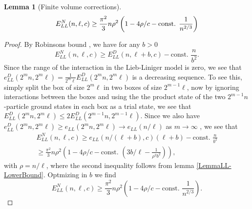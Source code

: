 \documentclass[a4paper,11pt]{article}
\newtheorem{lemma}{Lemma}
\numberwithin{equation}{section}
\begin{document}
	\begin{lemma}[Finite volume corrections]\label{LemmaLiebLinigerNeumannLowerBound}
		\begin{equation}
		E_{LL}^{N}(n,\ell,c)\geq \frac{\pi^2}{3}n\rho^2\left(1-4\rho/c-\textnormal{const. }\frac{1}{n^{2/3}}\right)
		\end{equation}
	\end{lemma}
	\begin{proof}
		By Robinsons bound \cite{robinson2014thermodynamic}, we have for any $ b>0 $ \begin{equation}
		E_{LL}^{N}(n,\ell,c)\geq E_{LL}^D(n,\ell+b,c)-\text{const. }\frac{n}{b^2}.
		\end{equation}
		Since the range of the interaction in the Lieb-Liniger model is zero, we see that $ e^D_{LL}(2^mn,2^m\ell)=\frac{1}{2^m\ell}E_{LL}^{D}(2^mn,2^m\ell) $ is a decreasing sequence. To see this, simply split the box of size $ 2^m\ell $ in two boxes of size $ 2^{m-1}\ell $, now by ignoring interactions between the boxes and using the the product state of the two $ 2^{m-1}n $-particle ground states in each box as a trial state, we see that $ E^D_{LL}(2^{m}n,2^m\ell)\leq 2E^D_{LL}(2^{m-1}n,2^{m-1}\ell)  $. Since we also have $ e^D_{LL}(2^mn,2^m\ell)\geq e_{LL}(2^mn,2^m\ell)\to e_{LL}(n/\ell) $ as $ m\to\infty $ \cite{PhysRev.130.1605}, we see that \begin{equation}
		\begin{aligned}
		E_{LL}^{N}(n,\ell,c)\geq e_{LL}(n/(\ell+b),c)(\ell+b)-\text{const. }\frac{n}{b^2}\\\geq \frac{\pi^2}{3}n\rho^2\left(1-4\rho/c-\text{const. }\left(3b/\ell-\frac{1}{\rho^2b^2}\right)\right),
		\end{aligned}
		\end{equation}
		with $ \rho=n/\ell $, where the second inequality follows from lemma \ref{LemmaLL-LowerBound}. Optmizing in $ b $ we find \begin{equation}
		E_{LL}^{N}(n,\ell,c)\geq \frac{\pi^2}{3}n\rho^2\left(1-4\rho/c-\text{const. }\frac{1}{n^{2/3}}\right).
		\end{equation}
	\end{proof}
\end{document}
